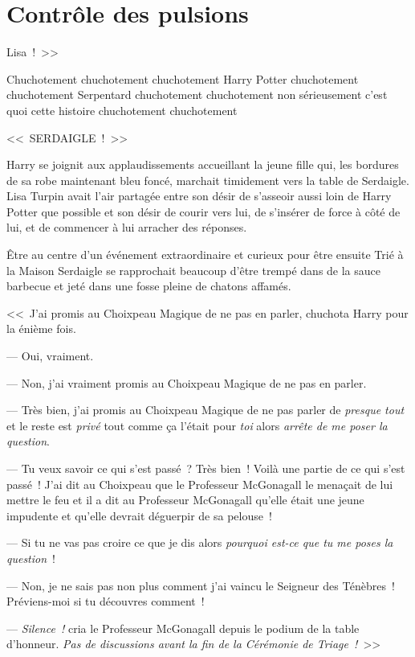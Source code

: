 \chapter{Contrôle des pulsions}

 Lisa~!~>>

\hplettrineextrapara
Chuchotement chuchotement chuchotement Harry Potter chuchotement chuchotement Serpentard chuchotement chuchotement non sérieusement c'est quoi cette histoire chuchotement chuchotement

<<~SERDAIGLE~!~>>

Harry se joignit aux applaudissements accueillant la jeune fille qui, les bordures de sa robe maintenant bleu foncé, marchait timidement vers la table de Serdaigle. Lisa Turpin avait l'air partagée entre son désir de s'asseoir aussi loin de Harry Potter que possible et son désir de courir vers lui, de s'insérer de force à côté de lui, et de commencer à lui arracher des réponses.

Être au centre d'un événement extraordinaire et curieux pour être ensuite Trié à la Maison Serdaigle se rapprochait beaucoup d'être trempé dans de la sauce barbecue et jeté dans une fosse pleine de chatons affamés.

<<~J'ai promis au Choixpeau Magique de ne pas en parler, chuchota Harry pour la énième fois.

--- Oui, vraiment.

--- Non, j'ai vraiment promis au Choixpeau Magique de ne pas en parler.

--- Très bien, j'ai promis au Choixpeau Magique de ne pas parler de \emph{presque tout} et le reste est \emph{privé} tout comme ça l'était pour \emph{toi} alors \emph{arrête de me poser la question}.

--- Tu veux savoir ce qui s'est passé~? Très bien~! Voilà une partie de ce qui s'est passé~! J'ai dit au Choixpeau que le Professeur McGonagall le menaçait de lui mettre le feu et il a dit au Professeur McGonagall qu'elle était une jeune impudente et qu'elle devrait déguerpir de sa pelouse~!

--- Si tu ne vas pas croire ce que je dis alors \emph{pourquoi est-ce que tu me poses la question}~!

--- Non, je ne sais pas non plus comment j'ai vaincu le Seigneur des Ténèbres~! Préviens-moi si tu découvres comment~!

--- \emph{Silence~!} cria le Professeur McGonagall depuis le podium de la table d'honneur. \emph{Pas de discussions avant la fin de la Cérémonie de Triage~!}~>>

